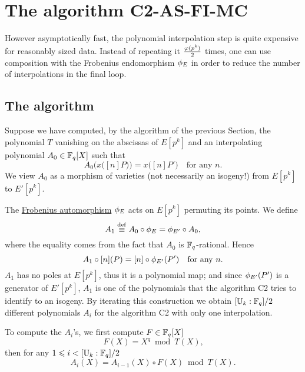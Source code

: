 \section{The algorithm C2-AS-FI-MC}
\label{sec:C2-AS-FI-MC}

However asymptotically fast, the polynomial interpolation step is
quite expensive for reasonably sized data. Instead of repeating it
$\frac{\varphi(p^k)}{2}$ times, one can use composition with the
Frobenius endomorphism $\phi_E$ in order to reduce the number of
interpolations in the final loop.

\subsection{The algorithm}
Suppose we have computed, by the algorithm of the previous Section,
the polynomial $T$ vanishing on the abscissas of $E[p^k]$ and an
interpolating polynomial $A_0\in\mathbb{F}_q[X]$ such that
\begin{equation*}
  A_0\bigl(x\bigl([n]P\bigr)\bigr) = x\bigl([n]P'\bigr)
  \quad\text{for any $n$.}
\end{equation*}
We view $A_0$ as a morphism of varieties (not necessarily an isogeny!)
from $E[p^k]$ to $E'[p^k]$.

The \hyperref[sec:curves-over-finite]{Frobenius automorphism}
$\phi_E$ acts on $E[p^k]$ permuting its points. We define
\begin{equation}
  \label{eq:183}
  A_1\overset{\mathrm{def}}{\equiv} A_0\circ\phi_E = \phi_{E'}\circ A_0
  \text{,}
\end{equation}
where the equality comes from the fact that $A_0$ is
$\mathbb{F}_q$-rational. Hence
\begin{equation*}
  A_1\circ[n](P) = [n]\circ\phi_{E'}(P')
  \quad\text{for any $n$.}
\end{equation*}
$A_1$ has no poles at $E[p^k]$, thus it is a polynomial map; and since
$\phi_{E'}(P')$ is a generator of $E'[p^k]$, $A_1$ is one of the
polynomials that the algorithm C2 tries to identify to an isogeny. By
iterating this construction we obtain $[\mathbb{U}_k:\mathbb{F}_q]/2$ different
polynomials $A_i$ for the algorithm C2 with only one interpolation.

To compute the $A_i$'s, we first compute $F\in\mathbb{F}_q[X]$
\begin{equation}
  \label{eq:frob}
  F(X) = X^q \bmod T(X)
  \text{,}
\end{equation}
then for any $1\leqslant i<[\mathbb{U}_k:\mathbb{F}_q]/2$
\begin{equation}
  \label{eq:modcomp}
  A_i(X) = A_{i-1}(X)\circ F(X) \bmod T(X)\text{.}
\end{equation}


